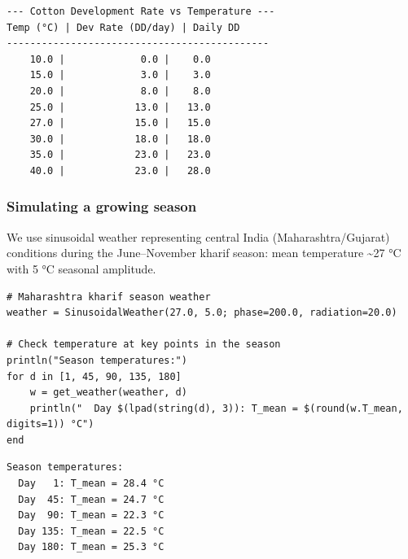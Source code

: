 \begin{verbatim}
--- Cotton Development Rate vs Temperature ---
Temp (°C) | Dev Rate (DD/day) | Daily DD
---------------------------------------------
    10.0 |             0.0 |    0.0
    15.0 |             3.0 |    3.0
    20.0 |             8.0 |    8.0
    25.0 |            13.0 |   13.0
    27.0 |            15.0 |   15.0
    30.0 |            18.0 |   18.0
    35.0 |            23.0 |   23.0
    40.0 |            23.0 |   28.0
\end{verbatim}



\subsubsection{Simulating a growing season}



\label{18150108392428042429}{}


We use sinusoidal weather representing central India (Maharashtra/Gujarat) conditions during the June–November kharif season: mean temperature {\textasciitilde}27 °C with 5 °C seasonal amplitude.




\begin{verbatim}
# Maharashtra kharif season weather
weather = SinusoidalWeather(27.0, 5.0; phase=200.0, radiation=20.0)

# Check temperature at key points in the season
println("Season temperatures:")
for d in [1, 45, 90, 135, 180]
    w = get_weather(weather, d)
    println("  Day $(lpad(string(d), 3)): T_mean = $(round(w.T_mean, digits=1)) °C")
end
\end{verbatim}




\begin{verbatim}
Season temperatures:
  Day   1: T_mean = 28.4 °C
  Day  45: T_mean = 24.7 °C
  Day  90: T_mean = 22.3 °C
  Day 135: T_mean = 22.5 °C
  Day 180: T_mean = 25.3 °C
\end{verbatim}




